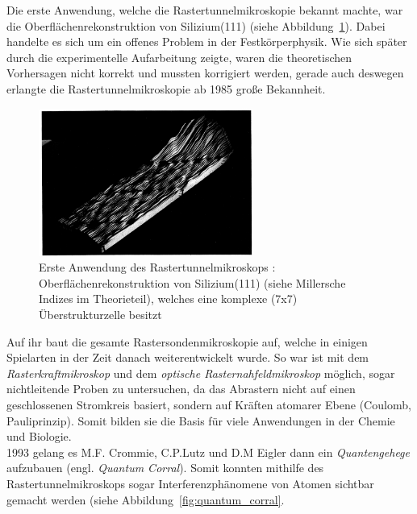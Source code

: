 Die erste Anwendung, welche die Rastertunnelmikroskopie bekannt
machte, war die Oberflächenrekonstruktion von Silizium(111)  
\cite{binnig1983111} (siehe Abbildung~\ref{fig:silicium}).
Dabei handelte es sich um ein offenes Problem in der
Festkörperphysik. Wie sich später durch die experimentelle
Aufarbeitung zeigte, waren die theoretischen Vorhersagen nicht 
korrekt und mussten korrigiert werden, gerade auch deswegen
erlangte die Rastertunnelmikroskopie ab 1985 große Bekannheit.
\begin{figure}
\includegraphics[width=7cm]{pics/silicium}
\caption{Erste Anwendung des Rastertunnelmikroskops 
\cite{binnig1983111}: 
Oberflächenrekonstruktion von Silizium(111) (siehe Millersche
Indizes im Theorieteil), welches eine komplexe (7x7) 
Überstrukturzelle besitzt}
 \label{fig:silicium}
\end{figure}

Auf ihr baut die gesamte Rastersondenmikroskopie auf, welche
in einigen Spielarten in der Zeit danach weiterentwickelt wurde.
So war ist mit dem \textit{Rasterkraftmikroskop}
und dem \textit{optische Rasternahfeldmikroskop} möglich, sogar
nichtleitende Proben zu untersuchen, da das Abrastern nicht auf
einen geschlossenen Stromkreis basiert, sondern auf Kräften 
atomarer Ebene (Coulomb, Pauliprinzip). Somit bilden sie die Basis
für viele Anwendungen in der Chemie und Biologie.\\
1993 gelang es M.F. Crommie, C.P.Lutz und
D.M Eigler \cite{crommie1993imaging} dann
ein \textit{Quantengehege} aufzubauen
(engl. \textit{Quantum Corral}). Somit konnten mithilfe
des Rastertunnelmikroskops sogar Interferenzphänomene von Atomen
sichtbar gemacht werden (siehe Abbildung~\ref{fig:quantum_corral}. 

